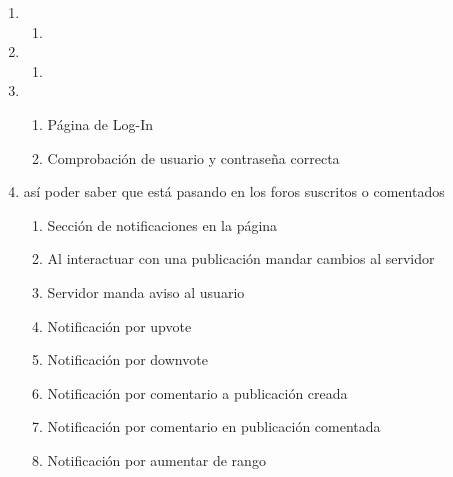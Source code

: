 \documentclass[12pt, letterpaper, notitlepage]{article}
\begin{document}
\begin{enumerate}
		
		\item {}
		\begin{enumerate}
			\item
		\end{enumerate}
		
		
		\item {}
		\begin{enumerate}
			\item
		\end{enumerate}
		
		
		
		
		\item {}
		\begin{enumerate}
			\item Página de Log-In
			\item Comprobación de usuario y contraseña correcta
		\end{enumerate}
		
		\item {}		
		{así poder saber que está pasando en los foros suscritos o comentados}
		\begin{enumerate}
			\item Sección de notificaciones en la página
			\item Al interactuar con una publicación mandar cambios al servidor
			\item Servidor manda aviso al usuario
			
			\item Notificación por upvote
			
			\item Notificación por downvote
			
			\item Notificación por comentario a publicación creada
			
			\item Notificación por comentario en publicación comentada
			
			\item Notificación por aumentar de rango
		\end{enumerate}
		
		
		

\end{enumerate}
\end{document}
